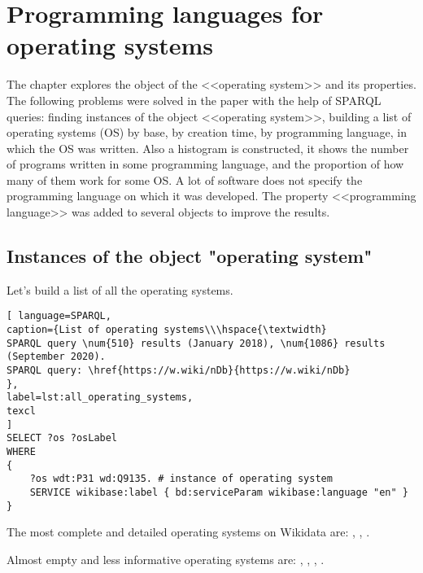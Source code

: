 \setchapterpreamble[u]{\margintoc}
\chapter[Operating systems]{Programming languages for operating systems\protect\footnotemark}


The chapter explores the object of the <<operating system>> and its properties. The following problems were solved in the paper with the help of SPARQL queries: finding instances of the object <<operating system>>, building a list of operating systems (OS) by base, by creation time, by programming language, in which the OS was written. Also a histogram is constructed, it shows the number of programs written in some programming language, and the proportion of how many of them work for some OS. A lot of software does not specify the programming language on which it was developed. The property <<programming language>> was added to several objects to improve the results.

\section{Instances of the object "operating system"}

Let's build a list of all the operating systems.

\begin{lstlisting}[ language=SPARQL, 
caption={List of operating systems\\\hspace{\textwidth} 
SPARQL query \num{510} results (January 2018), \num{1086} results (September 2020).
SPARQL query: \href{https://w.wiki/nDb}{https://w.wiki/nDb}
},
label=lst:all_operating_systems,
texcl 
]
SELECT ?os ?osLabel
WHERE
{
	?os wdt:P31 wd:Q9135. # instance of operating system
	SERVICE wikibase:label { bd:serviceParam wikibase:language "en" }
}
\end{lstlisting}

The most complete and detailed operating systems on Wikidata are: , , .

Almost empty and less informative operating systems are: , , , .

